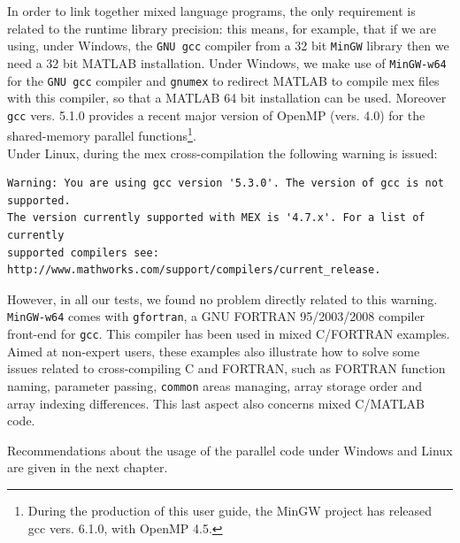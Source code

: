 \documentclass[a4paper,10pt]{report}%
\begin{document}
In order to link together mixed language programs, the only requirement is related to the runtime library precision:
this means, for example, that if we are using, under Windows, the {\tt GNU gcc} compiler from a 32 bit {\tt MinGW}
library \cite{MinGW} then we need a 32 bit MATLAB \cite{MATLAB} installation.
Under Windows, we make use of {\tt MinGW-w64} \cite{MinGW-w64} for the {\tt GNU gcc} compiler\cite{GNU:gcc} and
{\tt gnumex} \cite{GNUMEX} to redirect MATLAB to compile mex files with this compiler, so that a MATLAB 64 bit
installation can be used. Moreover {\tt gcc} vers. 5.1.0 provides a recent major version of OpenMP (vers. 4.0)
\cite{OMP:URL} for the shared-memory parallel functions\footnote{ During the production of this user guide, the MinGW project has released gcc vers. 6.1.0, with OpenMP 4.5.}.
\\
Under Linux, during the mex cross-compilation the following warning is issued:
\begin{lstlisting}
Warning: You are using gcc version '5.3.0'. The version of gcc is not supported.
The version currently supported with MEX is '4.7.x'. For a list of currently
supported compilers see:
http://www.mathworks.com/support/compilers/current_release. 
\end{lstlisting}
However, in all our tests, we found no problem directly related to this warning.
\\
{\tt MinGW-w64} comes with {\tt gfortran}, a GNU FORTRAN 95/2003/2008 compiler front-end for {\tt gcc}.
This compiler has been used in mixed C/FORTRAN examples.
\\
Aimed at non-expert users, these examples also illustrate how to solve some issues related to cross-compiling C
and FORTRAN, such as FORTRAN function naming, parameter passing, {\tt common} areas managing, array storage
order and array indexing differences. This last aspect also concerns mixed C/MATLAB code.

Recommendations about the usage of the parallel code under Windows and Linux are given in the next chapter.
\end{document}
